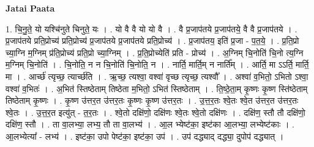 \documentclass[17pt]{extarticle}
\begin{document}
\textbf{Jatai Paata} \newline

1. चि॒नु॒ते॒ यो यश्चि॑नुते चिनुते॒ यः । . यो वै वै यो यो वै । . वै प्र॒जाप॑तये प्र॒जाप॑तये॒ वै वै प्र॒जाप॑तये । . प्र॒जाप॑तये प्रति॒प्रोच्य॑ प्रति॒प्रोच्य॑ प्र॒जाप॑तये प्र॒जाप॑तये प्रति॒प्रोच्य॑ । . प्र॒जाप॑तय॒ इति॑ प्र॒जा - प॒त॒ये॒ । . प्र॒ति॒प्रो च्या॒ग्नि म॒ग्निम् प्र॑ति॒प्रोच्य॑ प्रति॒प्रो च्या॒ग्निम् । . प्र॒ति॒प्रोच्येति॑ प्रति - प्रोच्य॑ । . अ॒ग्निम् चि॒नोति॑ चि॒नो त्य॒ग्नि म॒ग्निम् चि॒नोति॑ । . चि॒नोति॒ न न चि॒नोति॑ चि॒नोति॒ न । . नार्ति॒ मार्ति॒म् न नार्ति᳚म् । . आर्ति॒ मा ऽऽर्ति॒ मार्ति॒ मा । . आर्च्छ॑ त्यृच्छ॒ त्यार्च्छ॑ति । . ऋ॒च्छ॒ त्यश्वा॒ वश्वा॑ वृच्छ त्यृच्छ॒ त्यश्वौ᳚ । . अश्वा॑ व॒भितो॒ ऽभितो ऽश्वा॒ वश्वा॑ व॒भितः॑ । . अ॒भित॑ स्तिष्ठेताम् तिष्ठेता म॒भितो॒ ऽभित॑ स्तिष्ठेताम् । . ति॒ष्ठे॒ता॒म् कृ॒ष्णः कृ॒ष्ण स्ति॑ष्ठेताम् तिष्ठेताम् कृ॒ष्णः । . कृ॒ष्ण उ॑त्तर॒त उ॑त्तर॒तः कृ॒ष्णः कृ॒ष्ण उ॑त्तर॒तः । . उ॒त्त॒र॒तः श्वे॒तः श्वे॒त उ॑त्तर॒त उ॑त्तर॒तः श्वे॒तः । . उ॒त्त॒र॒त इत्यु॑त् - त॒र॒तः । . श्वे॒तो दक्षि॑णो॒ दक्षि॑णः श्वे॒तः श्वे॒तो दक्षि॑णः । . दक्षि॑ण॒ स्तौ तौ दक्षि॑णो॒ दक्षि॑ण॒ स्तौ । . ता वा॒लभ्या॒ लभ्य॒ तौ ता वा॒लभ्य॑ । . आ॒ल भ्येष्ट॑का॒ इष्ट॑का आ॒लभ्या॒ लभ्येष्ट॑काः । . आ॒लभ्येत्या᳚ - लभ्य॑ । . इष्ट॑का॒ उपो पेष्ट॑का॒ इष्ट॑का॒ उप॑ । . उप॑ दद्ध्याद् दद्ध्या॒ दुपोप॑ दद्ध्यात् । \newline
\end{document}
